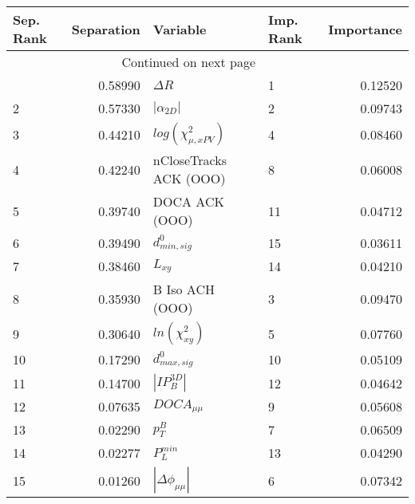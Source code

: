\usepackage{lscape}

\begin{landscape}
\begin{longtable}{lrllr}
\toprule
Sep. Rank &  Separation &                   Variable & Imp. Rank &  Importance \\
\midrule
\endhead
\midrule
\multicolumn{3}{r}{{Continued on next page}} \\
\midrule
\endfoot

\bottomrule
\endlastfoot
        1 &     0.58990 &                 $\Delta R$ &         1 &     0.12520 \\
        2 &     0.57330 &            $|\alpha_{2D}|$ &         2 &     0.09743 \\
        3 &     0.44210 &  $log(\chi^{2}_{\mu,xPV})$ &         4 &     0.08460 \\
        4 &     0.42240 &     nCloseTracks ACK (OOO) &         8 &     0.06008 \\
        5 &     0.39740 &             DOCA ACK (OOO) &        11 &     0.04712 \\
        6 &     0.39490 &           $d^0_{min, sig}$ &        15 &     0.03611 \\
        7 &     0.38460 &                   $L_{xy}$ &        14 &     0.04210 \\
        8 &     0.35930 &            B Iso ACH (OOO) &         3 &     0.09470 \\
        9 &     0.30640 &        $ln(\chi^{2}_{xy})$ &         5 &     0.07760 \\
       10 &     0.17290 &           $d^0_{max, sig}$ &        10 &     0.05109 \\
       11 &     0.14700 &            $|IP_{B}^{3D}|$ &        12 &     0.04642 \\
       12 &     0.07635 &            $DOCA_{\mu\mu}$ &         9 &     0.05608 \\
       13 &     0.02290 &                  $p^B_{T}$ &         7 &     0.06509 \\
       14 &     0.02277 &              $P^{min}_{L}$ &        13 &     0.04290 \\
       15 &     0.01260 &   $|\Delta \phi_{\mu\mu}|$ &         6 &     0.07342 \\
\end{longtable}

\end{landscape}
